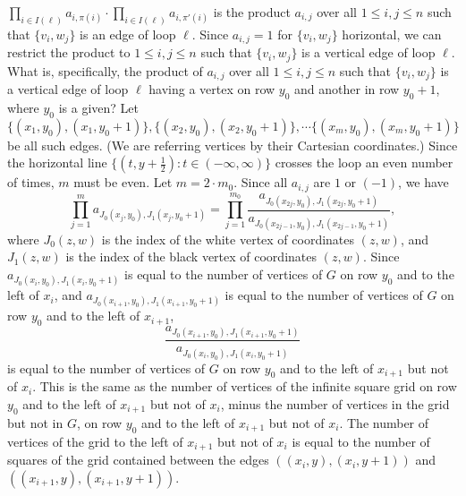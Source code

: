 \documentclass[10pt,reqno]{amsart}
\theoremstyle{plain}
\theoremstyle{definition}
\theoremstyle{remark}
\begin{document}
$\prod_{i\in I(\ell )} a_{i,\pi(i) } \cdot
			\prod_{i\in I(\ell )} a_{i,\pi \prime(i) }$
is the product $a_{i,j}$ over all $1\leq i,j\leq n$ such that
$\{v_i,w_j\}$ is an edge of loop $\ell $. Since $a_{i,j}=1$ for
$\{v_i, w_j\}$ horizontal, we can restrict the product to 
$1\leq i,j\leq n$ such that
$\{v_i,w_j\}$ is a vertical edge of loop $\ell $.
What is, specifically, the product of $a_{i,j}$ over all $1\leq i,j\leq n$
such that $\{v_i,w_j\}$ is a vertical edge of loop $\ell $ having
a vertex on row $y_0$ and another in row $y_0+1$, 
where $y_0$ is a given? Let
$\{(x_1,y_0),(x_1,y_0+1)\},\{(x_2,y_0),(x_2,y_0+1)\},\dotsb
\{(x_m,y_0),(x_m,y_0+1)\}$ be all such edges. (We are referring vertices
by their Cartesian coordinates.) Since the horizontal line
$\{(t,y+\frac{1}{2}): t\in (-\infty, \infty)\}$ crosses the loop
an even number of times, $m$ must be even. Let $m = 2\cdot m_0$.
Since all $a_{i,j}$ are $1$ or $(-1)$, we have
\begin{equation}\prod_{j=1}^m a_{J_0(x_j,y_0),J_1(x_j,y_0+1)} =
  \prod_{j=1}^{m_0} \frac{a_{J_0(x_{2j},y_0),J_1(x_{2j},y_0+1)}}
			 {a_{J_0(x_{2j-1},y_0),J_1(x_{2j-1},y_0+1)}} ,\end{equation}
where $J_0(z,w)$ is the index of the white vertex of coordinates
$(z,w)$, and $J_1(z,w)$ is the index of the black vertex of coordinates
$(z,w)$. Since $a_{J_0(x_i,y_0),J_1(x_i,y_0+1)}$ is equal to the
number of vertices of $G$ on row $y_0$ and to the left of $x_{i}$, and
$a_{J_0(x_{i+1},y_0),J_1(x_{i+1},y_0+1)}$ is equal to the
number of vertices of $G$ on row $y_0$ and to the left of $x_{i+1}$,
\begin{equation}\frac{a_{J_0(x_{i+1},y_0),J_1(x_{i+1},y_0+1)}}
			 {a_{J_0(x_{i},y_0),J_1(x_{i},y_0+1)}}\end{equation}
is equal to
the number of vertices of $G$ on row $y_0$ and to the left of $x_{i+1}$
but not of $x_i$. This is the same as the number of vertices of
the infinite square grid on row $y_0$ and to the left of $x_{i+1}$ but
not of $x_{i}$, minus the number of vertices in the grid but not in $G$,
on row $y_0$ and to the left of $x_{i+1}$ but
not of $x_{i}$. The number
of vertices of the grid to the left of $x_{i+1}$ but not of $x_i$ is
equal to the number of squares of the grid 
contained between the edges $((x_i,y),(x_i,y+1))$ and 
$((x_{i+1},y),(x_{i+1},y+1))$. 
\end{document}
